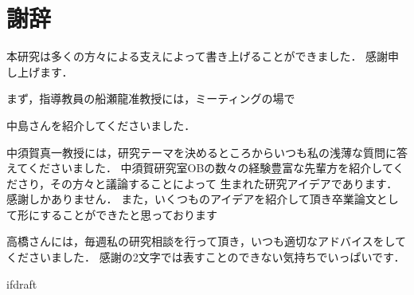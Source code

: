 \documentclass[11pt]{report}
\begin{document}
\fi

\chapter*{謝辞}
本研究は多くの方々による支えによって書き上げることができました．
感謝申し上げます．

まず，指導教員の船瀬龍准教授には，ミーティングの場で

中島さんを紹介してくださいました．

中須賀真一教授には，研究テーマを決めるところからいつも私の浅薄な質問に答えてくださいました．
中須賀研究室OBの数々の経験豊富な先輩方を紹介してくださり，その方々と議論することによって
生まれた研究アイデアであります．感謝しかありません．
また，いくつものアイデアを紹介して頂き卒業論文として形にすることができたと思っております

高橋さんには，毎週私の研究相談を行って頂き，いつも適切なアドバイスをしてくださいました．
感謝の2文字では表すことのできない気持ちでいっぱいです．




\expandafter\ifx\csname ifdraft\endcsname\relax
  
\end{document}
